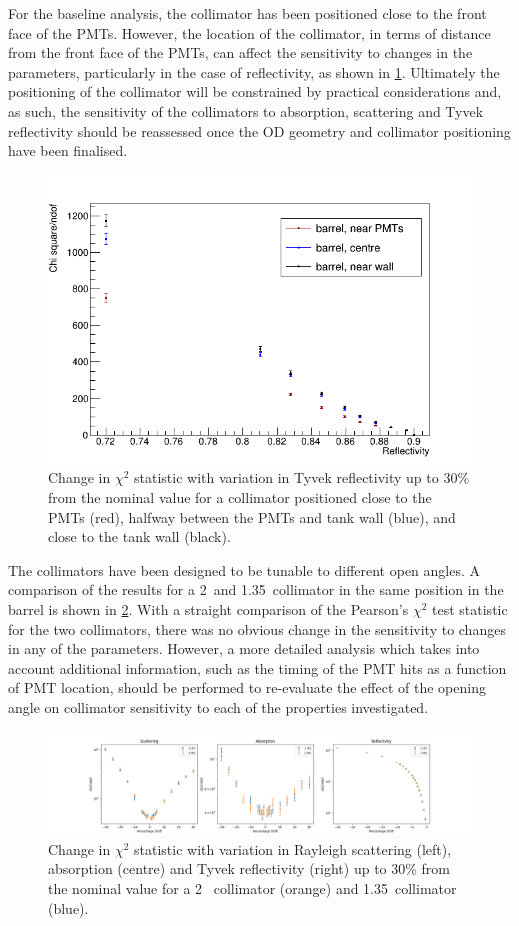 \documentclass[a4paper,11pt]{article}
\begin{document}
For the baseline analysis, the collimator has been positioned close to the front face of the PMTs. However, the location of the collimator, in terms of distance from the front face of the PMTs, can affect the sensitivity to changes in the parameters, particularly in the case of reflectivity, as shown in \cref{fig:refl_comparison_pmtdist.png}. Ultimately the positioning of the collimator will be constrained by practical considerations and, as such, the sensitivity of the collimators to absorption, scattering and Tyvek reflectivity should be reassessed once the OD geometry and collimator positioning have been finalised.

\begin{figure}[ht!]
    \centering
    \includegraphics[width=0.5\linewidth]{collimator_compare_positions_refl.png}
    \caption{Change in $\chi^2$ statistic with variation in Tyvek reflectivity up to 30\% from the nominal value for a collimator positioned close to the PMTs (red), halfway between the PMTs and tank wall (blue), and close to the tank wall (black).}
    \label{fig:refl_comparison_pmtdist.png}
\end{figure}

The collimators have been designed to be tunable to different open angles. A comparison of the results for a 2\textdegree~and 1.35\textdegree~collimator in the same position in the barrel is shown in \cref{fig:barrelCompareCollAngles}. With a straight comparison of the Pearson's $\chi^2$ test statistic for the two collimators, there was no obvious change in the sensitivity to changes in any of the parameters. However, a more detailed analysis which takes into account additional information, such as the timing of the PMT hits as a function of PMT location, should be performed to re-evaluate the effect of the opening angle on collimator sensitivity to each of the properties investigated.

\begin{figure}[ht!]
    \centering
    \includegraphics[width=\linewidth]{params_comparison_plots_1.35_2.00.png}
    \caption{Change in $\chi^2$ statistic with variation in Rayleigh scattering (left), absorption (centre) and Tyvek reflectivity (right) up to 30\% from the nominal value for a 2\textdegree~ collimator (orange) and 1.35\textdegree~collimator (blue).}
    \label{fig:barrelCompareCollAngles}
\end{figure}
\end{document}
